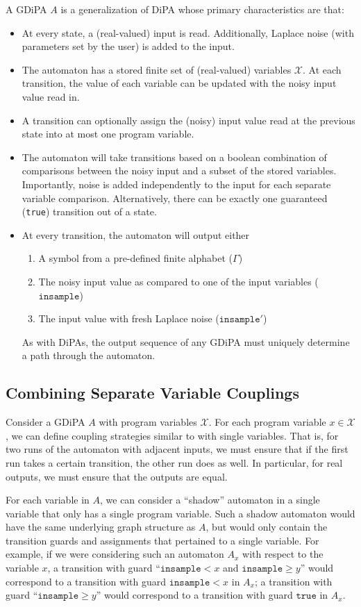 \documentclass[12pt]{article}
\newcommand{\gguard}[1][x]{\texttt{insample}\geq #1}
\newcommand{\lguard}[1][x]{\texttt{insample} < #1}
\theoremstyle{definition}
\begin{document}
A GDiPA $A$ is a generalization of DiPA whose primary characteristics are that:
\begin{itemize}
	\item At every state, a (real-valued) input is read. Additionally, Laplace noise (with parameters set by the user) is added to the input. 
	\item The automaton has a stored finite set of (real-valued) variables $\mathcal{X}$. At each transition, the value of each variable can be updated with the noisy input value read in. 
	\item A transition can optionally assign the (noisy) input value read at the previous state into at most one program variable.
	\item The automaton will take transitions based on a boolean combination of comparisons between the noisy input and a subset of the stored variables. Importantly, noise is added independently to the input for each separate variable comparison. Alternatively, there can be exactly one guaranteed (\texttt{true}) transition out of a state. 
	\item At every transition, the automaton will output either \begin{enumerate}
		\item A symbol from a pre-defined finite alphabet ($\Gamma$)
		\item The noisy input value as compared to one of the input variables ($\texttt{insample}$)
		\item The input value with fresh Laplace noise ($\texttt{insample}'$)
	\end{enumerate}
	As with DiPAs, the output sequence of any GDiPA must uniquely determine a path through the automaton.
\end{itemize}

\subsection{Combining Separate Variable Couplings}
Consider a GDiPA $A$ with program variables $\mathcal{X}$. For each program variable $x\in \mathcal{X}$, we can define coupling strategies similar to with single variables. That is, for two runs of the automaton with adjacent inputs, we must ensure that if the first run takes a certain transition, the other run does as well. In particular, for real outputs, we must ensure that the outputs are equal. 

For each variable in $A$, we can consider a ``shadow'' automaton in a single variable that only has a single program variable. Such a shadow automaton would have the same underlying graph structure as $A$, but would only contain the transition guards and assignments that pertained to a single variable. 
For example, if we were considering such an automaton $A_x$ with respect to the variable $x$, a transition with guard ``$\lguard[x]$ and $\gguard[y]$'' would correspond to a transition with guard $\lguard[x]$ in $A_x$; a transition with guard ``$\gguard[y]$'' would correspond to a transition with guard $\texttt{true}$ in $A_x$.
\end{document}
